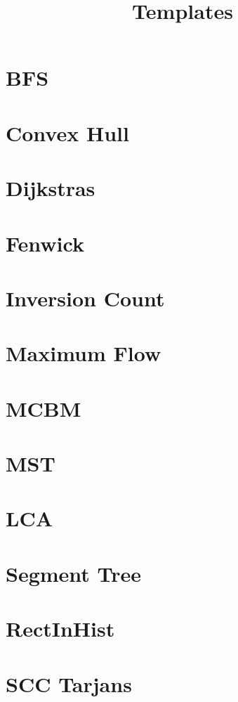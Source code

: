 \documentclass[]{article}
\begin{document}
    \title{Templates}
    \begin{multicols*}{2}
    {\tiny
    \section{BFS}
    
    \section{Convex Hull}
    
    \section{Dijkstras}
    
    \section{Fenwick}
    
    \section{Inversion Count}
    
    \section{Maximum Flow}
    
    \section{MCBM}
    
    \section{MST}
    
    \section{LCA}
    
    \section{Segment Tree}
    
    \section{RectInHist}
    
    \section{SCC Tarjans}
    
}
\end{multicols*}
\end{document}
